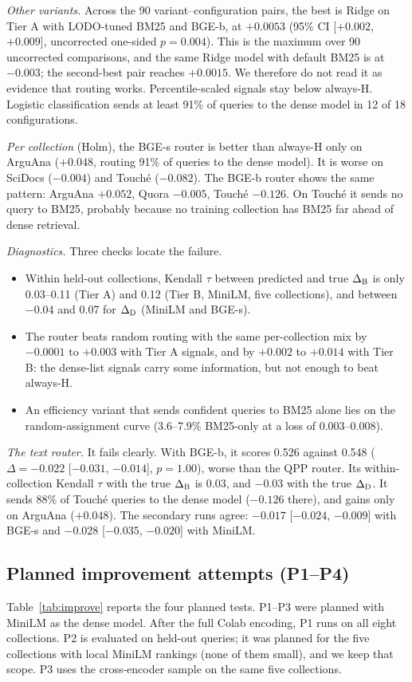 \documentclass[conference]{IEEEtran}
\newcommand{\B}{\textsc{B}}
\newcommand{\Dn}{\textsc{D}}
\newcommand{\Hy}{\textsc{H}}
\begin{document}
\emph{Other variants.} Across the 90 variant--configuration pairs, the best is Ridge on Tier A with LODO-tuned BM25 and BGE-b, at $+0.0053$ (95\% CI [$+0.002$, $+0.009$], uncorrected one-sided $p=0.004$). This is the maximum over 90 uncorrected comparisons, and the same Ridge model with default BM25 is at $-0.003$; the second-best pair reaches $+0.0015$. We therefore do not read it as evidence that routing works. Percentile-scaled signals stay below always-\Hy. Logistic classification sends at least 91\% of queries to the dense model in 12 of 18 configurations.

\emph{Per collection} (Holm), the BGE-s router is better than always-\Hy{} only on ArguAna ($+0.048$, routing 91\% of queries to the dense model). It is worse on SciDocs ($-0.004$) and Touch\'e ($-0.082$). The BGE-b router shows the same pattern: ArguAna $+0.052$, Quora $-0.005$, Touch\'e $-0.126$. On Touch\'e it sends no query to BM25, probably because no training collection has BM25 far ahead of dense retrieval.

\emph{Diagnostics.} Three checks locate the failure.
\begin{itemize}
\item Within held-out collections, Kendall $\tau$ between predicted and true $\Delta_\B$ is only 0.03--0.11 (Tier A) and 0.12 (Tier B, MiniLM, five collections), and between $-0.04$ and 0.07 for $\Delta_\Dn$ (MiniLM and BGE-s).
\item The router beats random routing with the same per-collection mix by $-0.0001$ to $+0.003$ with Tier A signals, and by $+0.002$ to $+0.014$ with Tier B: the dense-list signals carry some information, but not enough to beat always-\Hy.
\item An efficiency variant that sends confident queries to BM25 alone lies on the random-assignment curve (3.6--7.9\% BM25-only at a loss of 0.003--0.008).
\end{itemize}

\emph{The text router.} It fails clearly. With BGE-b, it scores 0.526 against 0.548 ($\Delta=-0.022$ [$-0.031$, $-0.014$], $p=1.00$), worse than the QPP router. Its within-collection Kendall $\tau$ with the true $\Delta_\B$ is 0.03, and $-0.03$ with the true $\Delta_\Dn$. It sends 88\% of Touch\'e queries to the dense model ($-0.126$ there), and gains only on ArguAna ($+0.048$). The secondary runs agree: $-0.017$ [$-0.024$, $-0.009$] with BGE-s and $-0.028$ [$-0.035$, $-0.020$] with MiniLM.

\subsection{Planned improvement attempts (P1--P4)}
\label{sec:improve}
Table~\ref{tab:improve} reports the four planned tests. P1--P3 were planned with MiniLM as the dense model. After the full Colab encoding, P1 runs on all eight collections. P2 is evaluated on held-out queries; it was planned for the five collections with local MiniLM rankings (none of them small), and we keep that scope. P3 uses the cross-encoder sample on the same five collections.
\end{document}

